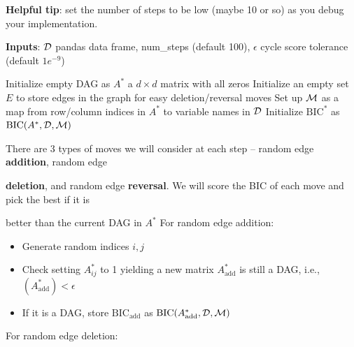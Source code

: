 \documentclass[letterpaper, 11pt]{article}
\begin{document}
\textbf{Helpful tip}: set the number of steps to be low (maybe 10 or so) as you debug your implementation.

\begin{algorithm}[t]
	\caption{} \label{alg:greedy}
	\begin{algorithmic}[1]
		\vspace{0.5em}
		\State \textbf{Inputs}: ${\cal D}$ pandas data frame, num\_steps (default 100), $\epsilon$ cycle score tolerance  (default $1e^{-9}$)
		\vspace{0.5em}

		\State Initialize empty DAG as $A^*$ a $d\times d$ matrix with all zeros
		\State Initialize an empty set $E$ to store edges in the graph for easy deletion/reversal moves
		\State Set up ${\cal M}$ as a map from row/column indices in $A^*$ to variable names in ${\cal D}$
		\State Initialize $\text{BIC}^*$ as $\text{BIC}(A^*, {\cal D}, {\cal M})$ 
		\vspace{0.5em}


		\vspace{0.5em}
		\State There are 3 types of moves we will consider at each step -- random edge \textbf{addition}, random edge

		\hspace{-0.25cm} \textbf{deletion}, and random edge \textbf{reversal}. We will score the BIC of each move and pick the best if it is

		\hspace{-0.25cm} better than the current DAG in $A^*$
		\vspace{0.5em}
		\State For random edge addition:

		\begin{itemize}
			\item Generate random indices $i, j$

			\item Check setting $A^*_{ij}$ to 1 yielding a new matrix $A_{\text{add}}^*$ is still a DAG, i.e., $(A_{\text{add}}^*)< \epsilon$

			\item If it is a DAG, store $\text{BIC}_{\text{add}}$ as $\text{BIC}(A_{\text{add}}^*, {\cal D}, {\cal M})$
		\end{itemize}

		\State For random edge deletion:


\end{algorithmic}
\end{algorithm}
\end{document}

